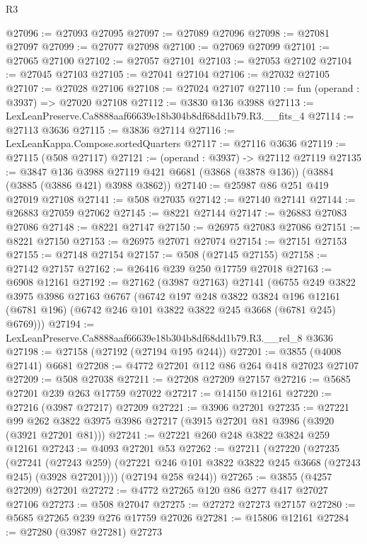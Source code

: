\begin{lexlean}{R3}
\begin{coremodule}
@27096 := @27093 @27095
@27097 := @27089 @27096
@27098 := @27081 @27097
@27099 := @27077 @27098
@27100 := @27069 @27099
@27101 := @27065 @27100
@27102 := @27057 @27101
@27103 := @27053 @27102
@27104 := @27045 @27103
@27105 := @27041 @27104
@27106 := @27032 @27105
@27107 := @27028 @27106
@27108 := @27024 @27107
@27110 := fun (operand : @3937) => @27020 @27108
@27112 := @3830 @136 @3988
@27113 := LexLeanPreserve.Ca8888aaf66639e18b304b8df68dd1b79.R3.__fits_4
@27114 := @27113 @3636
@27115 := @3836 @27114
@27116 := LexLeanKappa.Compose.sortedQuarters
@27117 := @27116 @3636
@27119 := @27115 (@508 @27117)
@27121 := (operand : @3937) -> @27112 @27119
@27135 := @3847
    @136
    @3988
    @27119
    @421
    @6681
    (@3868 (@3878 @136))
    (@3884 (@3885 (@3886 @421) @3988 @3862))
@27140 := @25987 @86 @251 @419 @27019 @27108
@27141 := @508 @27035
@27142 := @27140 @27141
@27144 := @26883 @27059 @27062
@27145 := @8221 @27144
@27147 := @26883 @27083 @27086
@27148 := @8221 @27147
@27150 := @26975 @27083 @27086
@27151 := @8221 @27150
@27153 := @26975 @27071 @27074
@27154 := @27151 @27153
@27155 := @27148 @27154
@27157 := @508 (@27145 @27155)
@27158 := @27142 @27157
@27162 := @26416 @239 @250 @17759 @27018
@27163 := @6908 @12161
@27192 := @27162
    (@3987 @27163)
    @27141
    (@6755
      @249
      @3822
      @3975
      @3986
      @27163
      @6767
      (@6742
        @197
        @248
        @3822
        @3824
        @196
        @12161
        (@6781 @196)
        (@6742 @246 @101 @3822 @3822 @245 @3668 (@6781 @245) @6769)))
@27194 := LexLeanPreserve.Ca8888aaf66639e18b304b8df68dd1b79.R3.__rel_8 @3636
@27198 := @27158 (@27192 (@27194 @195 @244))
@27201 := @3855 (@4008 @27141) @6681
@27208 := @4772 @27201 @112 @86 @264 @418 @27023 @27107
@27209 := @508 @27038
@27211 := @27208 @27209 @27157
@27216 := @5685 @27201 @239 @263 @17759 @27022
@27217 := @14150 @12161
@27220 := @27216 (@3987 @27217) @27209
@27221 := @3906 @27201
@27235 := @27221
    @99
    @262
    @3822
    @3975
    @3986
    @27217
    (@3915 @27201 @81 @3986 (@3920 (@3921 @27201 @81)))
@27241 := @27221 @260 @248 @3822 @3824 @259 @12161
@27243 := @4093 @27201 @53
@27262 := @27211
    (@27220
      (@27235
        (@27241
          (@27243 @259)
          (@27221 @246 @101 @3822 @3822 @245 @3668 (@27243 @245) (@3928 @27201))))
      (@27194 @258 @244))
@27265 := @3855 (@4257 @27209) @27201
@27272 := @4772 @27265 @120 @86 @277 @417 @27027 @27106
@27273 := @508 @27047
@27275 := @27272 @27273 @27157
@27280 := @5685 @27265 @239 @276 @17759 @27026
@27281 := @15806 @12161
@27284 := @27280 (@3987 @27281) @27273

\end{coremodule}
\end{lexlean}
